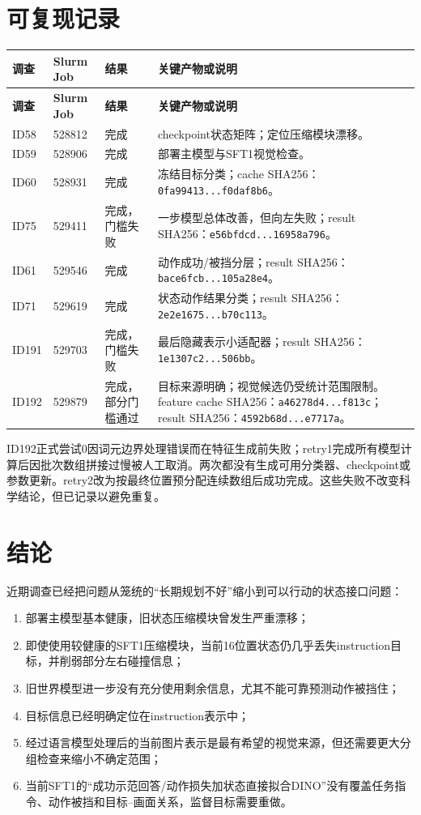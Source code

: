 \documentclass[UTF8,11pt,a4paper,fontset=none]{ctexart}
\newcommand{\code}[1]{\texttt{#1}}
\begin{document}
\section{可复现记录}

\begin{longtable}{p{1.3cm}p{2.2cm}p{2.3cm}p{8.3cm}}
\toprule
\textbf{调查} & \textbf{Slurm Job} & \textbf{结果} & \textbf{关键产物或说明} \\
\midrule
\endfirsthead
\toprule
\textbf{调查} & \textbf{Slurm Job} & \textbf{结果} & \textbf{关键产物或说明} \\
\midrule
\endhead
ID58 & 528812 & 完成 & checkpoint状态矩阵；定位压缩模块漂移。 \\
ID59 & 528906 & 完成 & 部署主模型与SFT1视觉检查。 \\
ID60 & 528931 & 完成 & 冻结目标分类；cache SHA256：\code{0fa99413...f0daf8b6}。 \\
ID75 & 529411 & 完成，门槛失败 & 一步模型总体改善，但向左失败；result SHA256：\code{e56bfdcd...16958a796}。 \\
ID61 & 529546 & 完成 & 动作成功/被挡分层；result SHA256：\code{bace6fcb...105a28e4}。 \\
ID71 & 529619 & 完成 & 状态动作结果分类；result SHA256：\code{2e2e1675...b70c113}。 \\
ID191 & 529703 & 完成，门槛失败 & 最后隐藏表示小适配器；result SHA256：\code{1e1307c2...506bb}。 \\
ID192 & 529879 & 完成，部分门槛通过 & 目标来源明确；视觉候选仍受统计范围限制。feature cache SHA256：\code{a46278d4...f813c}；result SHA256：\code{4592b68d...e7717a}。 \\
\bottomrule
\end{longtable}

ID192正式尝试0因词元边界处理错误而在特征生成前失败；retry1完成所有模型计算后因批次数组拼接过慢被人工取消。两次都没有生成可用分类器、checkpoint或参数更新。retry2改为按最终位置预分配连续数组后成功完成。这些失败不改变科学结论，但已记录以避免重复。

\section{结论}

近期调查已经把问题从笼统的“长期规划不好”缩小到可以行动的状态接口问题：

\begin{enumerate}
  \item 部署主模型基本健康，旧状态压缩模块曾发生严重漂移；
  \item 即使使用较健康的SFT1压缩模块，当前16位置状态仍几乎丢失instruction目标，并削弱部分左右碰撞信息；
  \item 旧世界模型进一步没有充分使用剩余信息，尤其不能可靠预测动作被挡住；
  \item 目标信息已经明确定位在instruction表示中；
  \item 经过语言模型处理后的当前图片表示是最有希望的视觉来源，但还需要更大分组检查来缩小不确定范围；
  \item 当前SFT1的“成功示范回答/动作损失加状态直接拟合DINO”没有覆盖任务指令、动作被挡和目标--画面关系，监督目标需要重做。
\end{enumerate}
\end{document}
